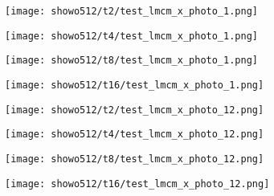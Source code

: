 \begin{figure*}[htbp]
    \centering


    \begin{minipage}{0.21\textwidth}
        \texttt{[image: showo512/t2/test\_lmcm\_x\_photo\_1.png]}
    \end{minipage}\hspace{0.1cm}%
    \begin{minipage}{0.21\textwidth}
        \texttt{[image: showo512/t4/test\_lmcm\_x\_photo\_1.png]}
    \end{minipage}\hspace{0.1cm}%
    \begin{minipage}{0.21\textwidth}
        \texttt{[image: showo512/t8/test\_lmcm\_x\_photo\_1.png]}
    \end{minipage}\hspace{0.1cm}%
    \begin{minipage}{0.21\textwidth}
        \texttt{[image: showo512/t16/test\_lmcm\_x\_photo\_1.png]}
    \end{minipage}\hspace{0.1cm}%

    \vspace{-0.1cm}

    \begin{minipage}{0.21\textwidth}
        \texttt{[image: showo512/t2/test\_lmcm\_x\_photo\_12.png]}
    \end{minipage}\hspace{0.1cm}%
    \begin{minipage}{0.21\textwidth}
        \texttt{[image: showo512/t4/test\_lmcm\_x\_photo\_12.png]}
    \end{minipage}\hspace{0.1cm}%
    \begin{minipage}{0.21\textwidth}
        \texttt{[image: showo512/t8/test\_lmcm\_x\_photo\_12.png]}
    \end{minipage}\hspace{0.1cm}%
    \begin{minipage}{0.21\textwidth}
        \texttt{[image: showo512/t16/test\_lmcm\_x\_photo\_12.png]}
    \end{minipage}\hspace{0.1cm}%

    \vspace{-0.1cm}


\end{figure*}
